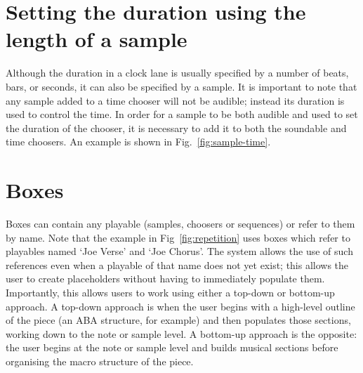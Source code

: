 \documentclass[runningheads,a4paper]{llncs}
\begin{document}
\section{Setting the duration using the length of a
	sample}\label{setting-the-duration-using-the-length-of-a-sample}

Although the duration in a clock lane is usually specified by a number of beats, bars, or seconds, it can also be specified by a sample. It is important to note that any sample added to a time chooser will not be audible; instead its duration is used to control the time. In order for a sample to be both audible and used to set the duration of the chooser,  it is necessary to add it to both the soundable and time choosers. An example is shown in Fig.~\ref{fig:sample-time}.




\section{Boxes}\label{sec:sequence}


Boxes can contain any playable (samples, choosers or sequences) or refer to them by name. Note that the example in Fig~\ref{fig:repetition} uses boxes which refer to playables named `Joe Verse' and `Joe Chorus'. The system allows the use of such references even when a playable of that name does not yet exist; this allows the user to create placeholders without having to immediately populate them. Importantly, this allows users to work using either a top-down or bottom-up approach. A top-down approach is when the user begins with a high-level outline of the piece (an ABA structure, for example) and then populates those sections, working down to the note or sample level. A bottom-up approach is the opposite: the user begins at the note or sample level and builds musical sections before organising the macro structure of the piece. 
\end{document}
